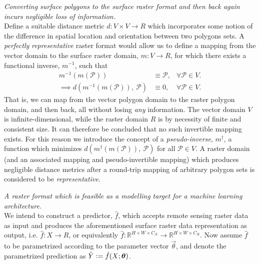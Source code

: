 \begin{description}[style=nextline]
  \item[Representative]
    \textit{Converting surface polygons to the surface raster format and then back again incurs negligible loss of information.}
    \\
    Define a suitable distance metric $d: V \times V \rightarrow{R}$ which incorporates some notion of the difference in spatial location and orientation between two polygons sets.
    A \emph{perfectly} \textit{representative} raster format would allow us to define a mapping from the vector domain to the surface raster domain, $m: V \rightarrow R$, for which there exists a functional inverse, $m^{-1}$, such that
    \begin{align*}
      m^{-1}\left(m(\mathcal{P})\right)
      &\equiv
      \mathcal{P},
      &\forall \mathcal{P} \in V.
      \\
      \implies d\left(
        m^{-1}(m(\mathcal{P})),~\mathcal{P}
      \right)
      &\equiv
      0,
      &\forall \mathcal{P} \in V.
    \end{align*}
    That is, we can map from the vector polygon domain to the raster polygon domain, and then back, all without losing \emph{any} information.
    The vector domain $V$ is infinite-dimensional, while the raster domain $R$ is by necessity of finite and consistent size.
    It can therefore be concluded that no such invertible mapping exists.
    For this reason we introduce the concept of a \textit{pseudo-inverse}, $m^{\dagger}$, a function which minimizes $d(m^{\dagger}(m(\mathcal{P})),~\mathcal{P})$ for all $\mathcal{P} \in V$.
    A raster domain (and an associated mapping and pseudo-invertible mapping) which produces negligible distance metrics after a round-trip mapping of arbitrary polygon sets is considered to be \textit{representative}.
  \item[Targetable] 
    \textit{A raster format which is feasible as a modelling target for a machine learning architecture.}
    \\
    We intend to construct a predictor, $\hat{f}$, which accepts remote sensing raster data as input and produces the aforementioned surface raster data representation as output, i.e.  $\hat{f}: X \rightarrow R$, or equivalently
    $
      \hat{f}:
        \mathbb{R}^{H \times W \times C_X}
        \rightarrow
        \mathbb{R}^{H \times W \times C_R}
    $.
    Now assume $\hat{f}$ to be parametrized according to the parameter vector $\vec{\theta}$, and denote the parametrized prediction as $\hat{Y} \vcentcolon= \hat{f}(X; \boldsymbol{\theta})$.

\end{description}
